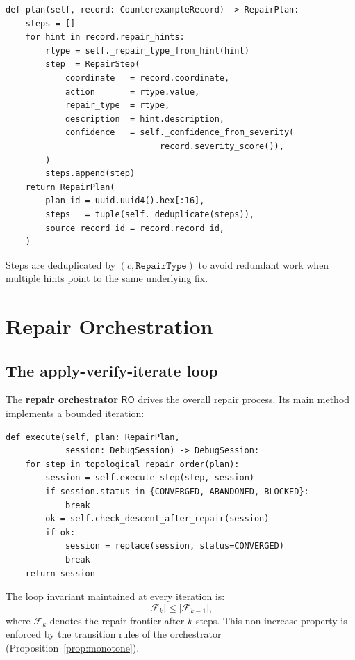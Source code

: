 \documentclass[11pt]{article}
\newcommand{\RF}{\mathcal{F}}               %
\newcommand{\RO}{\mathsf{RO}}               %
\begin{document}
\begin{lstlisting}[style=jugeo-python,caption={Simplified repair step enumeration (repair\_planning.py).}]
def plan(self, record: CounterexampleRecord) -> RepairPlan:
    steps = []
    for hint in record.repair_hints:
        rtype = self._repair_type_from_hint(hint)
        step  = RepairStep(
            coordinate   = record.coordinate,
            action       = rtype.value,
            repair_type  = rtype,
            description  = hint.description,
            confidence   = self._confidence_from_severity(
                               record.severity_score()),
        )
        steps.append(step)
    return RepairPlan(
        plan_id = uuid.uuid4().hex[:16],
        steps   = tuple(self._deduplicate(steps)),
        source_record_id = record.record_id,
    )
\end{lstlisting}

Steps are deduplicated by $(c, \texttt{RepairType})$ to avoid redundant work
when multiple hints point to the same underlying fix.

\section{Repair Orchestration}
\label{sec:orchestration}

\subsection{The apply-verify-iterate loop}

The \textbf{repair orchestrator} $\RO$ drives the overall repair process.
Its main method implements a bounded iteration:

\begin{lstlisting}[style=jugeo-python,caption={Orchestrator loop (repair\_execution.py, simplified).}]
def execute(self, plan: RepairPlan,
            session: DebugSession) -> DebugSession:
    for step in topological_repair_order(plan):
        session = self.execute_step(step, session)
        if session.status in {CONVERGED, ABANDONED, BLOCKED}:
            break
        ok = self.check_descent_after_repair(session)
        if ok:
            session = replace(session, status=CONVERGED)
            break
    return session
\end{lstlisting}

The loop invariant maintained at every iteration is:
\begin{equation}
  |\RF_k| \leq |\RF_{k-1}|,
  \label{eq:frontier-monotone}
\end{equation}
where $\RF_k$ denotes the repair frontier after $k$ steps.  This
non-increase property is enforced by the transition rules of the orchestrator
(Proposition~\ref{prop:monotone}).
\end{document}
